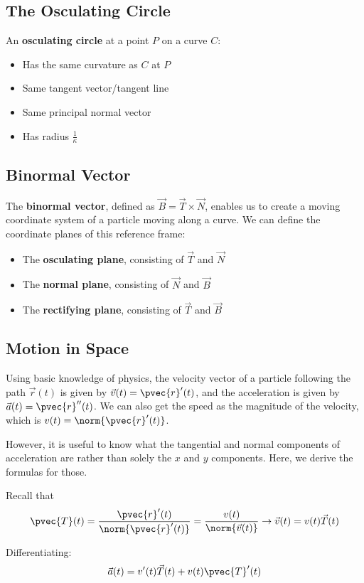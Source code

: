 \documentclass[12pt]{article}
\begin{document}
\subsection{The Osculating Circle}
An \textbf{osculating circle} at a point $P$ on a curve $C$:
\begin{itemize}
\item Has the same curvature as $C$ at $P$
\item Same tangent vector/tangent line
\item Same principal normal vector
\item Has radius $\frac{1}{\kappa}$
\end{itemize}

\subsection{Binormal Vector}
The \textbf{binormal vector}, defined as $\vec{B} = \vec{T} \times \vec{N}$, enables us to create a moving coordinate system of a particle moving along a curve. We can define the coordinate planes of this reference frame:
\begin{itemize}
\item The \textbf{osculating plane}, consisting of $\vec{T}$ and $\vec{N}$
\item The \textbf{normal plane}, consisting of $\vec{N}$ and $\vec{B}$
\item The \textbf{rectifying plane}, consisting of $\vec{T}$ and $\vec{B}$
\end{itemize}

\subsection{Motion in Space}
Using basic knowledge of physics, the velocity vector of a particle following the path $\vec{r}(t)$ is given by $\vec{v}(t) = \pvec{r}'(t)$, and the acceleration is given by $\vec{a}(t) = \pvec{r}''(t)$. We can also get the speed as the magnitude of the velocity, which is $v(t) = \norm{\pvec{r}'(t)}$.

However, it is useful to know what the tangential and normal components of acceleration are rather than solely the $x$ and $y$ components. Here, we derive the formulas for those.

Recall that \[ \pvec{T}(t) = \frac{\pvec{r}'(t)}{\norm{\pvec{r}'(t)}} = \frac{v(t)}{\norm{\vec{v}(t)}} \rightarrow \vec{v}(t) = v(t)\vec{T}(t) \]

Differentiating: \[ \vec{a}(t) = v'(t)\vec{T}(t) + v(t)\pvec{T}'(t) \]
\end{document}
